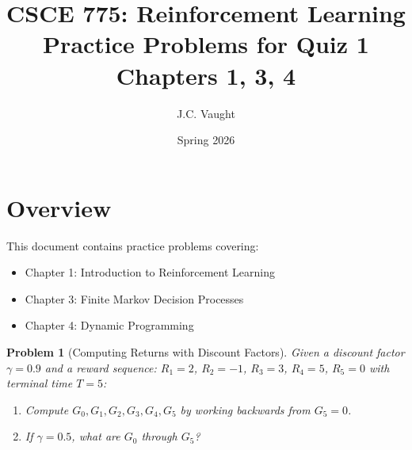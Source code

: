 \documentclass[11pt]{article}
\title{\textbf{CSCE 775: Reinforcement Learning} \\ Practice Problems for Quiz 1 \\ Chapters 1, 3, 4}
\author{J.C. Vaught}
\date{Spring 2026}
\newtheorem{problem}{Problem}
\theoremstyle{definition}
\begin{document}
\maketitle

\section*{Overview}
This document contains practice problems covering:
\begin{itemize}
    \item Chapter 1: Introduction to Reinforcement Learning
    \item Chapter 3: Finite Markov Decision Processes
    \item Chapter 4: Dynamic Programming
\end{itemize}

\newpage

\begin{problem}[Computing Returns with Discount Factors]
Given a discount factor $\gamma = 0.9$ and a reward sequence: $R_1 = 2$, $R_2 = -1$, $R_3 = 3$, $R_4 = 5$, $R_5 = 0$ with terminal time $T = 5$:
\begin{enumerate}[label=(\alph*)]
    \item Compute $G_0, G_1, G_2, G_3, G_4, G_5$ by working backwards from $G_5 = 0$.
    \item If $\gamma = 0.5$, what are $G_0$ through $G_5$?
\end{enumerate}
\end{problem}
\end{document}
